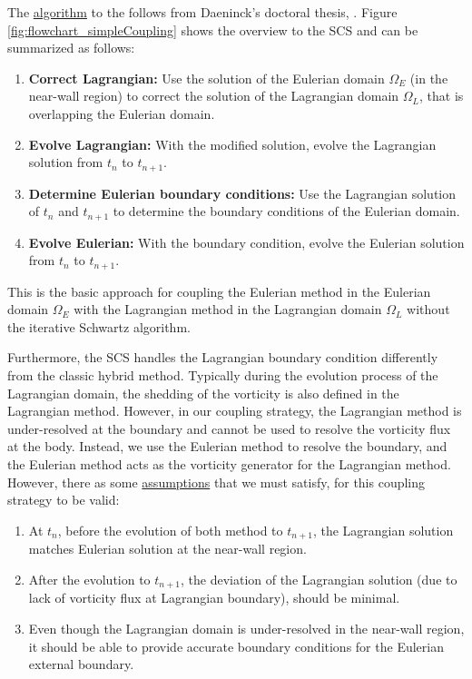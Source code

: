 The \underline{algorithm} to the  follows from Daeninck's doctoral thesis, \cite{Daeninck2006}. Figure \ref{fig:flowchart_simpleCoupling} shows the overview to the SCS and can be summarized as follows:

	\begin{enumerate}
	\item \textbf{Correct Lagrangian:} Use the solution of the Eulerian domain $\Omega_E$ (in the near-wall region) to correct the solution of the Lagrangian domain $\Omega_L$, that is overlapping the Eulerian domain.  
	
	\item \textbf{Evolve Lagrangian:} With the modified solution, evolve the Lagrangian solution from $t_n$ to $t_{n+1}$.
	
	\item \textbf{Determine Eulerian boundary conditions:} Use the Lagrangian solution of $t_n$ and $t_{n+1}$ to determine the boundary conditions of the Eulerian domain.
	
	\item \textbf{Evolve Eulerian:} With the boundary condition, evolve the Eulerian solution from $t_n$ to $t_{n+1}$.
	\end{enumerate}
	
This is the basic approach for coupling the Eulerian method in the Eulerian domain $\Omega_E$ with the Lagrangian method in the Lagrangian domain $\Omega_L$ without the iterative Schwartz algorithm. 

Furthermore, the SCS handles the Lagrangian boundary condition differently from the classic hybrid method. Typically during the evolution process of the Lagrangian domain, the shedding of the vorticity is also defined in the Lagrangian method. However, in our coupling strategy, the Lagrangian method is under-resolved at the boundary and cannot be used to resolve the vorticity flux at the body. Instead, we use the Eulerian method to resolve the boundary, and the Eulerian method acts as the vorticity generator for the Lagrangian method. However, there as some \underline{assumptions} that we must satisfy, for this coupling strategy to be valid:

	\begin{enumerate}
	\item At $t_n$, before the evolution of both method to $t_{n+1}$, the Lagrangian solution matches Eulerian solution at the near-wall region.
	\item After the evolution to $t_{n+1}$, the deviation of the Lagrangian solution (due to lack of vorticity flux at Lagrangian boundary), should be minimal.
	\item Even though the Lagrangian domain is under-resolved in the near-wall region, it should be able to provide accurate boundary conditions for the Eulerian external boundary.
	\end{enumerate}
	
